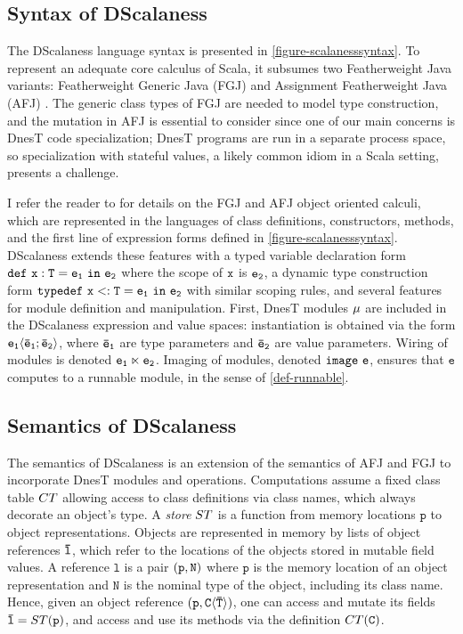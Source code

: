 \subsection{Syntax of DScalaness}

\scalanesssyntaxfig

The DScalaness language syntax is presented in \autoref{figure-scalanesssyntax}. To represent an
adequate core calculus of Scala, it subsumes two Featherweight Java variants: Featherweight
Generic Java (FGJ) \cite{FJ} and Assignment Featherweight Java (AFJ) \cite{AFJ}. The generic
class types of FGJ are needed to model type construction, and the mutation in AFJ is essential
to consider since one of our main concerns is DnesT code specialization; DnesT programs are run
in a separate process space, so specialization with stateful values, a likely common idiom in a
Scala setting, presents a challenge.

I refer the reader to \cite{FJ,AFJ} for details on the FGJ and AFJ object oriented calculi,
which are represented in the languages of class definitions, constructors, methods, and the
first line of expression forms defined in \autoref{figure-scalanesssyntax}. DScalaness extends
these features with a typed variable declaration form $\jdef{x}{T}{e_1}{e_2}$ where the scope of
$\tt{x}$ is $\tt{e_2}$, a dynamic type construction form $\jtlet{x}{T}{e_1}{e_2}$ with similar
scoping rules, and several features for module definition and manipulation. First, DnesT modules
$\jmodval$ are included in the DScalaness expression and value spaces: instantiation is obtained
via the form $\jinst{e_1}{\ttvec{e}_1; \ttvec{e}_2}$, where $\ttvec{e}_\texttt{1}$ are type
parameters and $\ttvec{e}_\texttt{2}$ are value parameters. Wiring of modules is denoted
$\jwire{\tt{e_1}}{\tt{e_2}}$. Imaging of modules, denoted $\jimage{\texttt{e}}$, ensures that
$\texttt{e}$ computes to a runnable module, in the sense of \autoref{def-runnable}.

\subsection{Semantics of DScalaness}

The semantics of DScalaness is an extension of the semantics of AFJ and FGJ to incorporate DnesT
modules and operations. Computations assume a fixed class table $\CT$ allowing access to class
definitions via class names, which always decorate an object's type. A \emph{store} $\jstore$ is
a function from memory locations $\texttt{p}$ to object representations. Objects are represented
in memory by lists of object references $\ttvec{l}$, which refer to the locations of the objects
stored in mutable field values. A reference $\texttt{l}$ is a pair $\jref{\texttt{p}}{N}$ where
$\texttt{p}$ is the memory location of an object representation and $\texttt{N}$ is the nominal
type of the object, including its class name. Hence, given an object reference
$\jref{\texttt{p}}{\jinst{C}{\ttvec{T}}}$, one can access and mutate its fields $\ttvec{l} =
\jstore(\texttt{p})$, and access and use its methods via the definition $\CT(\texttt{C})$.

